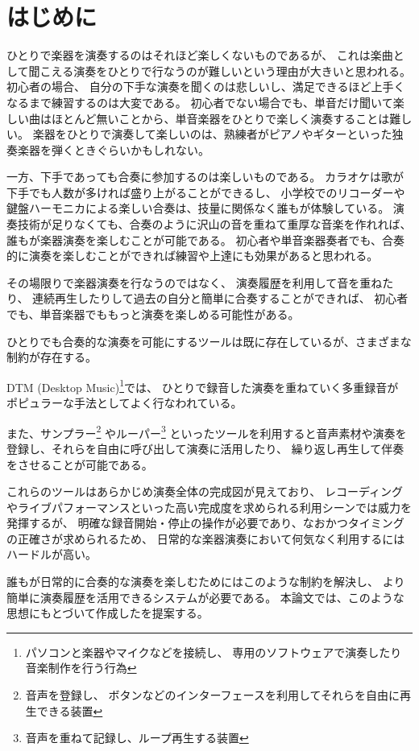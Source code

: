 %
%
\section{はじめに}
\label{sec:start}

ひとりで楽器を演奏するのはそれほど楽しくないものであるが、
これは楽曲として聞こえる演奏をひとりで行なうのが難しいという理由が大きいと思われる。
%
初心者の場合、 自分の下手な演奏を聞くのは悲しいし、満足できるほど上手くなるまで練習するのは大変である。
初心者でない場合でも、単音だけ聞いて楽しい曲はほとんど無いことから、単音楽器をひとりで楽しく演奏することは難しい。
楽器をひとりで演奏して楽しいのは、熟練者がピアノやギターといった独奏楽器を弾くときぐらいかもしれない。

一方、下手であっても合奏に参加するのは楽しいものである。
カラオケは歌が下手でも人数が多ければ盛り上がることができるし、
小学校でのリコーダーや鍵盤ハーモニカによる楽しい合奏は、技量に関係なく誰もが体験している。
演奏技術が足りなくても、合奏のように沢山の音を重ねて重厚な音楽を作れれば、誰もが楽器演奏を楽しむことが可能である。
初心者や単音楽器奏者でも、合奏的に演奏を楽しむことができれば練習や上達にも効果があると思われる。

その場限りで楽器演奏を行なうのではなく、
演奏履歴を利用して音を重ねたり、
連続再生したりして過去の自分と簡単に合奏することができれば、
初心者でも、単音楽器でももっと演奏を楽しめる可能性がある。

ひとりでも合奏的な演奏を可能にするツールは既に存在しているが、さまざまな制約が存在する。

DTM (Desktop Music)\footnote{パソコンと楽器やマイクなどを接続し、
    専用のソフトウェアで演奏したり音楽制作を行う行為}では、
ひとりで録音した演奏を重ねていく多重録音が
ポピュラーな手法としてよく行なわれている\cite{jacob}\cite{resound}。


また、サンプラー\footnote{音声を登録し、
    ボタンなどのインターフェースを利用してそれらを自由に再生できる装置}
やルーパー\footnote{音声を重ねて記録し、ループ再生する装置}
といったツールを利用すると音声素材や演奏を登録し、それらを自由に呼び出して演奏に活用したり、
繰り返し再生して伴奏をさせることが可能である。

これらのツールはあらかじめ演奏全体の完成図が見えており、
レコーディングやライブパフォーマンスといった高い完成度を求められる利用シーンでは威力を発揮するが、
明確な録音開始・停止の操作が必要であり、なおかつタイミングの正確さが求められるため、
日常的な楽器演奏において何気なく利用するにはハードルが高い。

誰もが日常的に合奏的な演奏を楽しむためにはこのような制約を解決し、
より簡単に演奏履歴を活用できるシステムが必要である。
本論文では、このような思想にもとづいて作成した{\system}を提案する。
